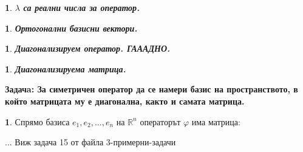 \documentclass[11pt]{article}
\numberwithin{equation}{section}
\numberwithin{figure}{section}
\numberwithin{table}{section}
\theoremstyle{plain}
\theoremstyle{definition}
\theoremstyle{remark}
\theoremstyle{definition}
\theoremstyle{remark}
\theoremstyle{plain}
\theoremstyle{definition}
\theoremstyle{definition}
\newtheorem{example}[thm]{\protect\examplename}
\theoremstyle{plain}
\theoremstyle{plain}
\newtheorem{prop}[thm]{\protect\propositionname}
\theoremstyle{plain}
\theoremstyle{definition}
\theoremstyle{plain}
\providecommand{\examplename}{Пример}
\providecommand{\propositionname}{Твърдение}
\begin{document}
\begin{prop}
\textbf{$\lambda$ са реални числа за оператор.}
\end{prop}

\begin{prop}
\textbf{Ортогонални базисни вектори.}
\end{prop}

\begin{prop}
\textbf{Диагонализируем оператор. ГАААДНО.}
\end{prop}

\begin{prop}
\textbf{Диагонализируема матрица.}
\end{prop}

\hrulefill

\textbf{Задачa: За симетричен оператор да се намери базис на пространството, в който матрицата му е диагонална, както и самата матрица.}

\begin{example}
Спрямо базиса $e_1, e_2, ..., e_n$ на $\mathbb{R}^n$ операторът $\varphi$ има матрица:

... Виж задача 15 от файла 3-примерни-задачи

\end{example}

\hrulefill
\end{document}

